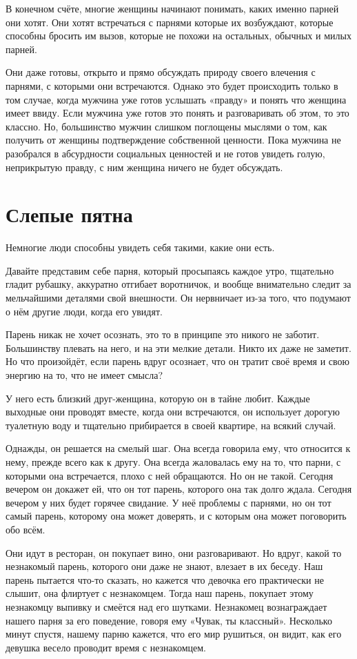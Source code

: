 В конечном счёте, многие женщины начинают понимать, каких именно парней они хотят. Они хотят встречаться с парнями которые их возбуждают, которые способны бросить им вызов, которые не похожи на остальных, обычных и милых парней.

Они даже готовы, открыто и прямо обсуждать природу своего влечения с парнями, с которыми они встречаются. Однако это будет происходить только в том случае, когда мужчина уже готов услышать «правду» и понять что женщина имеет ввиду. Если мужчина уже готов это понять и разговаривать об этом, то это классно. Но, большинство мужчин слишком поглощены мыслями о том, как получить от женщины подтверждение собственной ценности. Пока мужчина не разобрался в абсурдности социальных ценностей и не готов увидеть голую, неприкрытую правду, с ним женщина ничего не будет обсуждать.

\chapter{Слепые пятна}

Немногие люди способны увидеть себя такими, какие они есть.

Давайте представим себе парня, который просыпаясь каждое утро, тщательно гладит рубашку, аккуратно отгибает воротничок, и вообще внимательно следит за мельчайшими деталями свой внешности. Он нервничает из-за того, что подумают о нём другие люди, когда его увидят.

Парень никак не хочет осознать, это то в принципе это никого не заботит. Большинству плевать на него, и на эти мелкие детали. Никто их даже не заметит. Но что произойдёт, если парень вдруг осознает, что он тратит своё время и свою энергию на то, что не имеет смысла?

У него есть близкий друг-женщина, которую он в тайне любит. Каждые выходные они проводят вместе, когда они встречаются, он использует дорогую туалетную воду и тщательно прибирается в своей квартире, на всякий случай.

Однажды, он решается на смелый шаг. Она всегда говорила ему, что относится к нему, прежде всего как к другу. Она всегда жаловалась ему на то, что парни, с которыми она встречается, плохо с ней обращаются. Но он не такой. Сегодня вечером он докажет ей, что он тот парень, которого она так долго ждала. Сегодня вечером у них будет горячее свидание. У неё проблемы с парнями, но он тот самый парень, которому она может доверять, и с которым она может поговорить обо всём.

Они идут в ресторан, он покупает вино, они разговаривают. Но вдруг, какой то незнакомый парень, которого они даже не знают, влезает в их беседу. Наш парень пытается что-то сказать, но кажется что девочка его практически не слышит, она флиртует с незнакомцем. Тогда наш парень, покупает этому незнакомцу выпивку и смеётся над его шутками. Незнакомец вознаграждает нашего парня за его поведение, говоря ему «Чувак, ты классный». Несколько минут спустя, нашему парню кажется, что его мир рушиться, он видит, как его девушка весело проводит время с незнакомцем.

